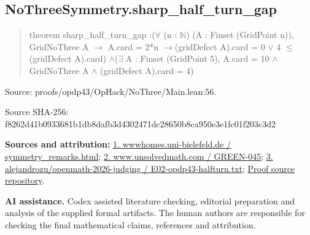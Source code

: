 \documentclass[11pt,a4paper]{article}
\begin{document}
\begin{samepage}
\subsection{NoThreeSymmetry.sharp\_half\_turn\_gap}
\begin{quote}\small\ttfamily theorem sharp\_half\_turn\_gap :\newline     (\ensuremath{\forall} (n : \ensuremath{\mathbb{N}}) (A : Finset (GridPoint n)), GridNoThree A \ensuremath{\to} A.card = 2*n \ensuremath{\to}\newline       (gridDefect A).card = 0 \ensuremath{\vee} 4 \ensuremath{\leq} (gridDefect A).card) \ensuremath{\wedge}\newline     (\ensuremath{\exists} A : Finset (GridPoint 5), A.card = 10 \ensuremath{\wedge} GridNoThree A \ensuremath{\wedge} (gridDefect A).card = 4)\end{quote}
{\small Source: proofs/opdp43/OpHack/NoThree/Main.lean:56.\par}

{\small Source SHA-256: f8262d41b0933681b1db8dafb3d4302471dc28650b8ca950e3e1fc01f203c3d2\par}

{\small\textbf{Sources and attribution:} \href{https://wwwhomes.uni-bielefeld.de/achim/no3in/symmetry_remarks.html}{1. wwwhomes.uni-bielefeld.de / symmetry\_remarks.html}; \href{https://www.unsolvedmath.com/problems/GREEN-045}{2. www.unsolvedmath.com / GREEN-045}; \href{https://github.com/alejandrozu/openmath-2026-judging/blob/d0ed487f487fa7ec814ff705ab55249983fe8707/OpenMath-Judging/review/entries/E02-opdp43-halfturn.txt}{3. alejandrozu/openmath-2026-judging / E02-opdp43-halfturn.txt}; \href{https://github.com/alejandrozu/openmath-2026-judging}{Proof source repository}.\par}

\end{samepage}
{\small \textbf{AI assistance.} Codex assisted literature checking, editorial preparation and analysis of the supplied formal artifacts. The human authors are responsible for checking the final mathematical claims, references and attribution.\par}
\end{document}
